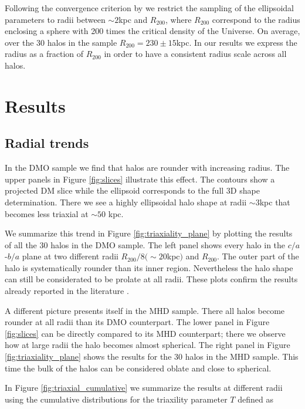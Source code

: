 \documentclass[usenatbib]{mnras}
\begin{document}
Following the convergence criterion by \cite{VeraCiro11} we
restrict the sampling of the ellipsoidal parameters to radii between
$\sim 2$kpc and $R_{200}$, where  $R_{200}$ correspond to the radius
enclosing a sphere with 200 times the critical density of the Universe.
On average, over the 30 halos in the sample $R_{200}=230\pm 15$kpc. 
In our results we express the radius as a fraction of $R_{200}$ in
order to have a consistent radius scale across all halos.

\section{Results}
\label{sec:results}

\subsection{Radial trends}

In the DMO sample we find that halos are rounder with increasing
radius.
The upper panels in Figure \ref{fig:slices} illustrate this effect.
The contours show a projected DM slice while the ellipsoid corresponds
to the full 3D shape determination. 
There we see a highly ellipsoidal halo shape at radii $\sim 3$kpc
that becomes less triaxial at $\sim 50$ kpc.

We summarize this trend in Figure \ref{fig:triaxiality_plane} by
plotting the results of all the 30 halos in the DMO sample.
The left panel shows every halo in the $c/a$-$b/a$ plane at
two different radii $R_{200}/8 (\sim 20$kpc$)$ and $R_{200}$. 
The outer part of the halo is systematically rounder than its inner
region. 
Nevertheless the halo shape can still be considerated to be prolate at
all radii. 
These plots confirm the results already reported in the
literature \citep{VeraCiro11}.

A different picture presents itself in the MHD sample.
There all halos become rounder at all radii than its DMO
counterpart.
The lower panel in Figure \ref{fig:slices} can be directly compared to
its MHD counterpart; there we observe how at large radii the halo
becomes almost spherical. 
The right panel in Figure \ref{fig:triaxiality_plane} shows the
results for the 30 halos in the MHD sample.
This time the bulk of the halos can be considered oblate and close to
spherical. 

In Figure \ref{fig:triaxial_cumulative} we summarize the results at
different radii using the cumulative distributions for the 
triaxility parameter $T$ defined as 
\end{document}
